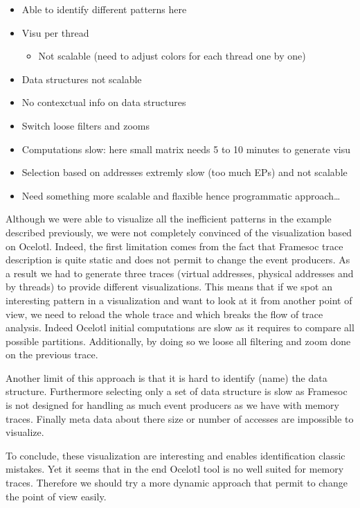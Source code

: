 \begin{itemize}
    \item Able to identify different patterns here
    \item Visu per thread
        \begin{itemize}
            \item Not scalable (need to adjust colors for each thread one by one)
        \end{itemize}
    \item Data structures not scalable
    \item No contexctual info on data structures
    \item Switch loose filters and zooms
    \item Computations slow: here small matrix needs 5 to 10 minutes to generate visu
    \item Selection based on addresses extremly slow (too much EPs) and not scalable
    \item Need something more scalable and flaxible hence programmatic approach\ldots
\end{itemize}

Although we were able to visualize all the inefficient patterns in the example described previously, we were not completely convinced of the visualization based on \gls{Ocelotl}.
Indeed, the first limitation comes from the fact that \gls{Framesoc} trace description is quite static and does not permit to change the event producers.
As a result we had to generate three traces (virtual addresses, physical addresses and by threads) to provide different visualizations.
This means that if we spot an interesting pattern in a visualization and want to look at it from another point of view, we need to reload the whole trace and  which breaks the flow of trace analysis.
Indeed \gls{Ocelotl} initial computations are slow as it requires to compare all possible partitions.
Additionally, by doing so we loose all filtering and zoom done on the previous trace.

Another limit of this approach is that it is hard to identify (name) the data structure.
Furthermore selecting only a set of data structure is slow as \gls{Framesoc} is not designed for handling as much event producers as we have with memory traces.
Finally meta data about there size or number of accesses are impossible to visualize.

To conclude, these visualization are interesting and enables identification classic mistakes.
Yet it seems that in the end \gls{Ocelotl} tool is no well suited for memory traces.
Therefore we should try a more dynamic approach that permit to change the point of view easily.

